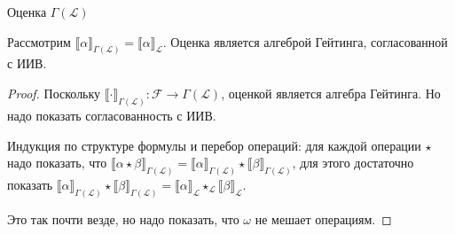 \documentclass[aspectratio=169]{beamer}
\begin{document}
\begin{frame}{Оценка $\Gamma(\mathcal{L})$}
\begin{thmrus}Рассмотрим $\llbracket \alpha \rrbracket_{\Gamma(\mathcal{L})} = \llbracket \alpha \rrbracket_\mathcal{L}$.
Оценка является алгеброй Гейтинга, согласованной с ИИВ.
\end{thmrus}
\begin{proof}
Поскольку $\llbracket\cdot\rrbracket_{\Gamma(\mathcal{L})} : \mathcal{F} \rightarrow \Gamma(\mathcal{L})$, оценкой является алгебра Гейтинга.
Но надо показать согласованность с ИИВ.

Индукция по структуре формулы и перебор операций: для каждой операции $\star$ надо показать, что 
  $\llbracket \alpha \star \beta \rrbracket_{\Gamma(\mathcal{L})} =
   \llbracket \alpha \rrbracket_{\Gamma(\mathcal{L})}\star\llbracket \beta \rrbracket_{\Gamma(\mathcal{L})}$, для этого достаточно
показать
  $\llbracket \alpha \rrbracket_{\Gamma(\mathcal{L})}\star\llbracket \beta \rrbracket_{\Gamma(\mathcal{L})} = 
   \llbracket \alpha \rrbracket_\mathcal{L}\star_\mathcal{L} \llbracket \beta \rrbracket_{\mathcal{L}}$.

Это так почти везде, но надо показать, что $\omega$ не мешает операциям.
\end{proof}
\end{frame}
\end{document}
